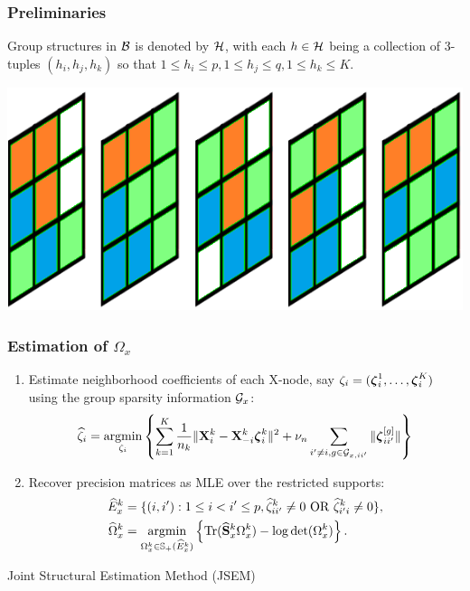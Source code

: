 \documentclass[10pt]{beamer}
\theoremstyle{definition}
\DeclareMathOperator*{\Tr}{Tr}
\DeclareMathOperator*{\argmin}{argmin}
\begin{document}
\begin{frame}
\frametitle{Preliminaries}

Group structures in ${\cal{B}}$ is denoted by ${\cal{H}}$, with each $h \in {\cal{H}}$ being a collection of 3-tuples $(h_i,h_j,h_k)$ so that $1 \leq h_i \leq p, 1 \leq h_j \leq q, 1 \leq h_k \leq K$.

\vspace{2em}
\centering
\includegraphics[width=.5\textwidth]{layersB}
\end{frame}


\begin{frame}
\frametitle{Estimation of $\Omega_x$}

\begin{enumerate} %
\item Estimate neighborhood coefficients of each X-node, say $\zeta_i = ({\boldsymbol{\zeta}}_i^1, \ldots, {\boldsymbol{\zeta}}_i^K)$ using the group sparsity information ${\cal{G}}_x$:
%
$$
\widehat \zeta_i = \argmin_{\zeta_i} \left\{ \sum_{k=1}^K \frac{1}{n_k} \| \bfX_i^k - \bfX_{-i}^k \bfzeta_i^k \|^2 + \nu_n \sum_{i' \neq i, g \in \cG_{x,ii'}} \| \bfzeta_{ii'}^{[g]} \| \right\}
$$

\item Recover precision matrices as MLE over the restricted supports: %
%
\begin{align*}
\widehat E_x^k &= \{(i,i'): 1 \leq i < i' \leq p, \widehat \zeta_{ii'}^k \neq 0 \text{ OR } \widehat \zeta_{i'i}^k \neq 0 \},\\
\widehat \Omega_x^k &= \argmin_{\Omega_x^k \in \BS_+ (\widehat E_x^k)}
\left\{ \Tr (\widehat \bfS_x^k \Omega_x^k ) - \log \det (\Omega_x^k) \right\}.
\end{align*}
%
\end{enumerate}

\vspace{1em}

\begin{center} %
{\colb Joint Structural Estimation Method (JSEM)}

\cite{MaMichailidis15}
\end{center}

\end{frame}
\end{document}
